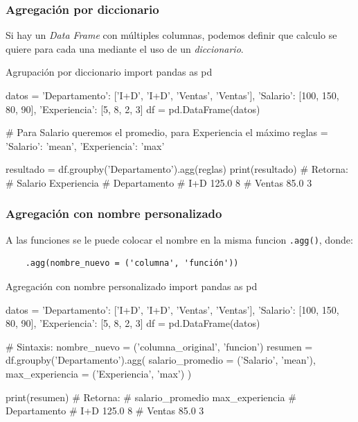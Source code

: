 \subsubsection{Agregación por diccionario}

Si hay un \textit{Data Frame} con múltiples columnas, podemos definir que calculo se quiere para cada una mediante el uso de un \textit{diccionario}.
\begin{pycode}{Agrupación por diccionario}
import pandas as pd

datos = {
    'Departamento': ['I+D', 'I+D', 'Ventas', 'Ventas'],
    'Salario': [100, 150, 80, 90],
    'Experiencia': [5, 8, 2, 3]
}
df = pd.DataFrame(datos)

# Para Salario queremos el promedio, para Experiencia el máximo
reglas = {
    'Salario': 'mean',
    'Experiencia': 'max'
}

resultado = df.groupby('Departamento').agg(reglas)
print(resultado) # Retorna:
#               Salario  Experiencia
# Departamento                      
# I+D             125.0            8
# Ventas           85.0            3    
\end{pycode}

\subsubsection{Agregación con nombre personalizado}

A las funciones se le puede colocar el nombre en la misma funcion \texttt{.agg()}, donde:
\begin{verbatim}
    .agg(nombre_nuevo = ('columna', 'función'))
\end{verbatim}

\begin{pycode}{Agregación con nombre personalizado}
import pandas as pd

datos = {
    'Departamento': ['I+D', 'I+D', 'Ventas', 'Ventas'],
    'Salario': [100, 150, 80, 90],
    'Experiencia': [5, 8, 2, 3]
}
df = pd.DataFrame(datos)

# Sintaxis: nombre_nuevo = ('columna_original', 'funcion')
resumen = df.groupby('Departamento').agg(
    salario_promedio = ('Salario', 'mean'),
    max_experiencia = ('Experiencia', 'max')
)

print(resumen) # Retorna:
#               salario_promedio  max_experiencia
# Departamento                                   
# I+D                      125.0                8
# Ventas                    85.0                3 
\end{pycode}

